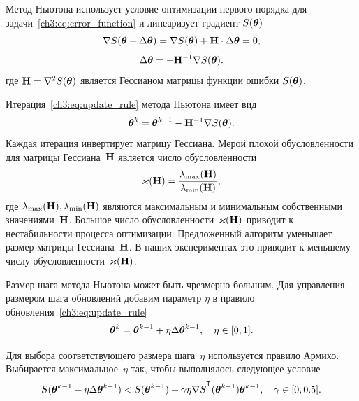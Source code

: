 Метод Ньютона использует условие оптимизации первого порядка для задачи~\eqref{ch3:eq:error_function} и линеаризует градиент $S (\boldsymbol{\theta})$
\[
\nabla S (\boldsymbol{\theta} + \Delta \boldsymbol{\theta}) = \nabla S(\boldsymbol{\theta}) + \mathbf{H} \cdot \Delta \boldsymbol{\theta} = 0,
\]
\[
\Delta \boldsymbol{\theta} = - \mathbf{H}^{-1} \nabla S(\boldsymbol{\theta}).
\]
где $\mathbf{H} = \nabla^2 S(\boldsymbol{\theta})$ является Гессианом матрицы функции ошибки $S(\boldsymbol{\theta})$.

Итерация~\eqref{ch3:eq:update_rule} метода Ньютона имеет вид
\[
\boldsymbol{\theta}^k = \boldsymbol{\theta}^{k-1} - \mathbf{H}^{-1} \nabla S(\boldsymbol{\theta}).
\]
Каждая итерация инвертирует матрицу Гессиана.
Мерой плохой обусловленности для матрицы Гессиана~$\mathbf{H}$ является число обусловленности
\[
\varkappa(\mathbf{H}) = \frac{\lambda_{\text{max}}(\mathbf{H})}{\lambda_{\text{min}}(\mathbf{H})},
\]
где $\lambda_{\text{max}}(\mathbf{H}), \lambda_{\text{min}}(\mathbf{H})$ являются максимальным и минимальным собственными значениями~$\mathbf{H}$. Большое число обусловленности~$\varkappa (\mathbf{H})$ приводит к нестабильности процесса оптимизации.
Предложенный алгоритм уменьшает размер матрицы Гессиана~$\mathbf{H}$. В наших экспериментах это приводит к меньшему числу обусловленности~$\varkappa (\mathbf{H})$.

Размер шага метода Ньютона может быть чрезмерно большим. Для управления размером шага обновлений добавим параметр $\eta$ в правило обновления~\eqref{ch3:eq:update_rule}
\[
\boldsymbol{\theta}^k = \boldsymbol{\theta}^{k - 1} + \eta \Delta \boldsymbol{\theta}^{k - 1}, \quad \eta \in [0, 1].
\]

Для выбора соответствующего размера шага~$\eta$ используется правило Армихо. Выбирается максимальное~$\eta$ так, чтобы выполнялось следующее условие
\[
S(\btheta^{k - 1} + \eta \Delta \btheta^{k - 1}) < S(\btheta^{k - 1}) + \gamma \eta \nabla S^{\T}(\btheta^{k-1})\btheta^{k - 1}, \quad \gamma \in [0, 0.5].
\]

